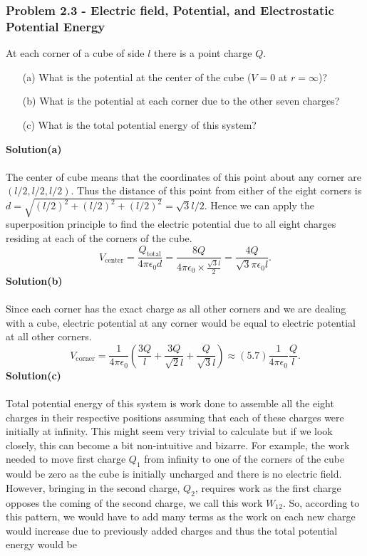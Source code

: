 \documentclass{article}
\begin{document}
\subsubsection*{Problem 2.3 - Electric field, Potential, and Electrostatic Potential Energy}
At each corner of a cube of side $l$ there is a point charge $Q$.
\begin{enumerate}
    \item[(a)] What is the potential at the center of the cube ($V=0$ at $r=\infty$)?
    \item[(b)] What is the potential at each corner due to the other seven charges?
    \item[(c)]What is the total potential energy of this system?
\end{enumerate}
\textbf{Solution(a)}
\\
\\The center of cube means that the coordinates of this point about any corner are $(l/2,l/2,l/2)$. Thus the distance of this point from either of the eight corners is $d=\sqrt{(l/2)^2+(l/2)^2+(l/2)^2}=\sqrt{3}l/2$. Hence we can apply the superposition principle to find the electric potential due to all eight charges residing at each of the corners of the cube.
\[V_\text{center}=\frac{Q_{\text{total}}}{4\pi\epsilon_0d}=\frac{8Q}{4\pi\epsilon_0\times\frac{\sqrt{3}l}{2}}=\frac{4Q}{\sqrt{3}\pi\epsilon_0l}.\]
\textbf{Solution(b)}
\\
\\Since each corner has the exact charge as all other corners and we are dealing with a cube, electric potential at any corner would be equal to electric potential at all other corners.
\[V_{\text{corner}}=\frac{1}{4\pi\epsilon_0}\left(\frac{3Q}{l}+\frac{3Q}{\sqrt{2}l}+\frac{Q}{\sqrt{3}l}\right)\approx(5.7)\frac{1}{4\pi\epsilon_0}\frac{Q}{l}.\]
\textbf{Solution(c)}
\\
\\Total potential energy of this system is work done to assemble all the eight charges in their respective positions assuming that each of these charges were initially at infinity. This might seem very trivial to calculate but if we look closely, this can become a bit non-intuitive and bizarre. For example, the work needed to move first charge $Q_1$ from infinity to one of the corners of the cube would be zero as the cube is initially uncharged and there is no electric field. However, bringing in the second charge, $Q_2$, requires work as the first charge opposes the coming of the second charge, we call this work $W_{12}$. So, according to this pattern, we would have to add many terms as the work on each new charge would increase due to previously added charges and thus the total potential energy would be
\end{document}
